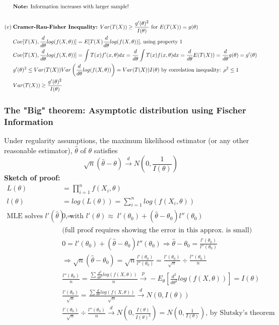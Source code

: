 \documentclass{article}
\begin{document}
\begin{align*}
    & \textrm{\textbf{Note:} Information increases with larger sample!}\\ \\
    (v) \; & \textrm{\textbf{Cramer-Rau-Fisher Inequality:} }Var(T(X)) \geq \frac{g'(\theta)^2}{I(\theta)} \textrm{ for } E(T(X)) = g(\theta)\\
    & Cov[T(X), \frac{d}{d\theta}log(f(X, \theta))] = E[T(X)\frac{d}{d\theta}log(f(X, \theta))] \textrm{, using property 1}\\
    & Cov[T(X), \frac{d}{d\theta}log(f(X, \theta))] = \int T(x)f'(x, \theta)dx = \frac{d}{d\theta} \int T(x)  f(x, \theta)dx = \frac{d}{d\theta}E(T(X)) = \frac{d}{d\theta}g(\theta) = g'(\theta)\\
    &g'(\theta)^2 \leq Var(T(X))Var \left (\frac{d}{d\theta}log(f(X, \theta)) \right) = Var(T(X))I(\theta) \textrm{ by correlation inequality: } \rho^2 \leq 1\\
    &Var(T(X)) \geq \frac{g'(\theta)^2}{I(\theta)}
\end{align*}
\subsubsection{The "Big" theorem: Asymptotic distribution using Fischer Information}
Under regularity assumptions, the maximum likelihood estimator (or any other reasonable estimator), $\hat{\theta}$ of $\theta$ satisfies
\begin{equation*}
    \sqrt{n}(\hat{\theta} - \theta) \overset{d}{\longrightarrow} N\left(0, \frac{1}{I(\theta)}\right)
\end{equation*}
\textbf{Sketch of proof:}
\begin{align*}
    L(\theta) &= \prod_{i=1}^nf(X_i, \theta)\\
    l(\theta) &= log(L(\theta)) = \sum_{i=1}^nlog(f(X_i, \theta))\\
    \textrm{MLE solves } l'(\hat{\theta}) = &0 \textrm{, with } l'(\theta) \approx \; l'(\theta_0) + (\hat{\theta} - \theta_0)l''(\theta_0)\\
    &\textrm{(full proof requires showing the error in this approx. is small)}\\
    &0 = l'(\theta_0) + (\hat{\theta} - \theta_0)l''(\theta_0) \Longrightarrow \hat{\theta} - \theta_0 = \frac{l'(\theta_0)}{l''(\theta_0)}\\
    &\Longrightarrow \sqrt{n}(\hat{\theta} - \theta_0) = \sqrt{n}\frac{l'(\theta_0)}{l''(\theta_0)} = \frac{l'(\theta_0)}{\sqrt{n}} \div \frac{l''(\theta_0)}{n}\\
    & \frac{l''(\theta_0)}{n} = \frac{\sum \frac{d^2}{d\theta^2}log(f(X, \theta))}{n} \overset{p}{\longrightarrow}  - E_\theta \left [\frac{d^2}{d\theta^2}log(f(X, \theta)) \right ] = I(\theta)\\
    & \frac{l'(\theta_0)}{\sqrt{n}} = \frac{\sum \frac{d}{d\theta}log(f(X, \theta))}{\sqrt{n}} \overset{d}{\longrightarrow} N(0, I(\theta))\\
    & \frac{l'(\theta_0)}{\sqrt{n}} \div \frac{l''(\theta_0)}{n} \overset{d}{\longrightarrow} N\left(0, \frac{I(\theta)}{I(\theta)^2}\right) = N\left(0, \frac{1}{I(\theta)}\right) \textrm{, by Slutsky's theorem}
\end{align*}
\end{document}
